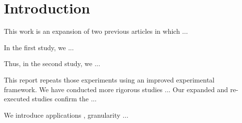 \section{Introduction}
\label{sec:intro}
 This work is an expansion of two previous articles in which ...
 
 In the first study, we ...
 
 Thus, in the second study, we ...
 
 This report repeats those experiments using an improved experimental framework. We have conducted more rigorous studies ... Our expanded and re-executed studies confirm the ...
 
We introduce applications , granularity ... 